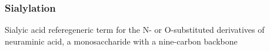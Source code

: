 \subsubsection {Sialylation}
Sialyic acid referegeneric term for the N- or O-substituted derivatives of neuraminic acid, a monosaccharide with a nine-carbon backbone